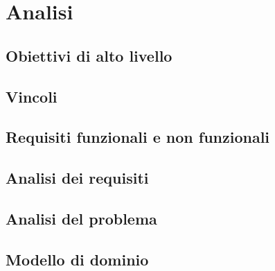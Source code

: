 \section{Analisi}\label{analisi}

\subsection{Obiettivi di alto livello}\label{obiettivi-di-alto-livello}

\subsection{Vincoli}\label{vincoli}

\subsection{Requisiti funzionali e non
funzionali}\label{requisiti-funzionali-e-non-funzionali}

\subsection{Analisi dei requisiti}\label{analisi-dei-requisiti}

\subsection{Analisi del problema}\label{analisi-del-problema}

\subsection{Modello di dominio}\label{modello-di-dominio}
